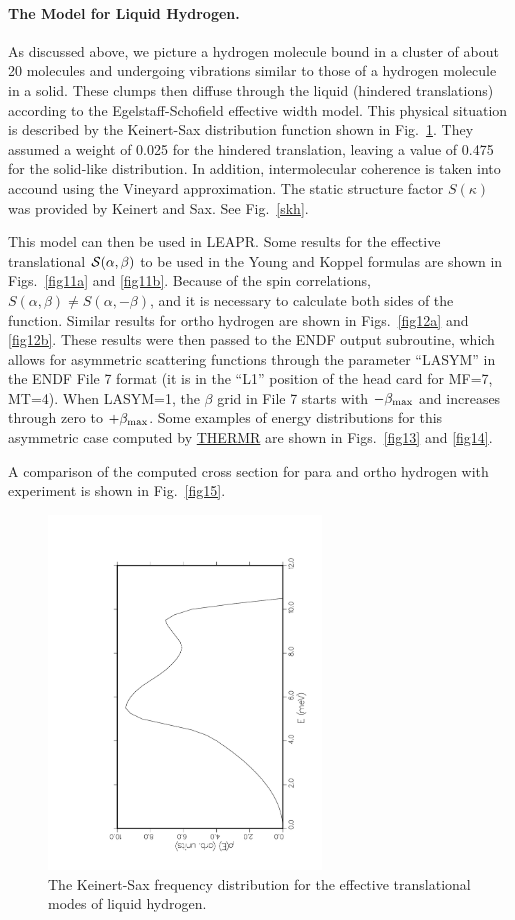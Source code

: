 \paragraph{The Model for Liquid Hydrogen.}
As discussed above, we picture a hydrogen molecule bound in a cluster of
about 20 molecules and undergoing vibrations similar to those of a
hydrogen molecule in a solid.  These clumps then diffuse through the
liquid (hindered translations) according to the Egelstaff-Schofield
effective width model.  This physical situation is described by the
Keinert-Sax distribution function shown in Fig.~\ref{fig10}.  They
assumed a weight of 0.025 for the hindered translation, leaving a value
of 0.475 for the solid-like distribution.  In addition,
intermolecular coherence is taken into accound using the
Vineyard approximation.  The static
structure factor $S(\kappa)$ was
provided by Keinert and Sax. See Fig.~\ref{skh}.

This model can then be used in LEAPR.  Some results for the
effective translational ${\cal S}(\alpha,\beta)$ to be used in
the Young and Koppel formulas are shown in Figs.~\ref{fig11a}
and \ref{fig11b}.  Because  of the spin correlations,
$S(\alpha,\beta) {\ne} S(\alpha,-\beta)$, and it is necessary to
calculate both sides of the function.  Similar results for ortho
hydrogen are shown in Figs.~\ref{fig12a} and \ref{fig12b}.
These results were then passed to the ENDF output subroutine,
which allows for asymmetric scattering functions through the
parameter ``LASYM'' in the ENDF File 7 format (it is in the
``L1'' position of the head card for MF=7, MT=4).  When LASYM=1,
the $\beta$ grid in File 7 starts with $-\beta_{\rm max}$ and
increases through zero to $+\beta_{\rm max}$.  Some examples
of energy distributions for this asymmetric case computed by
\hyperlink{sTHERMRhy}{THERMR} are shown in Figs.~\ref{fig13}
and \ref{fig14}.

A comparison of the computed cross section for para and ortho
hydrogen with experiment is shown in Fig.~\ref{fig15}.

\begin{figure}[bp]\centering
\includegraphics[keepaspectratio, height=3.7in, angle=270]{figs/le10ack}
\caption[Keinert-Sax frequency spectrum]{The Keinert-Sax frequency
 distribution for the effective translational modes of liquid hydrogen.}
\label{fig10}
\end{figure}

